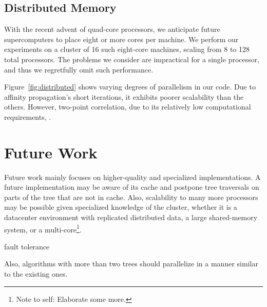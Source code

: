 \documentclass[twoside,leqno,twocolumn]{article}
\newcommand{\authornote}[1]{\footnote{Note to self: #1}}
\newcommand{\authorsnote}[1]{\authornote{#1}}
\newcommand{\fig}[1]{Figure~\ref{fig:#1}}
\begin{document}
\subsection{Distributed Memory}

With the recent advent of quad-core processors, we anticipate future supercomputers to place eight or more cores per machine.
We perform our experiments on a cluster of 16 such eight-core machines, scaling from 8 to 128 total processors.
The problems we consider are impractical for a single processor, and thus we regretfully omit such performance.

\fig{distributed} shows varying degrees of parallelism in our code.
Due to affinity propagation's short iterations, it exhibits poorer scalability than the others.
However, two-point correlation, due to its relatively low computational requirements, .

\section{Future Work}

Future work mainly focuses on higher-quality and specialized implementations.
A future implementation may be aware of its cache and postpone tree traversals on parts of the tree that are not in cache.
Also, scalability to many more processors may be possible given specialized knowledge of the cluster, whether it is a datacenter environment with replicated distributed data, a large shared-memory system, or a multi-core\authorsnote{Elaborate some more.}.

fault tolerance

Also, algorithms with more than two trees should parallelize in a manner similar to the existing ones.



\end{document}
